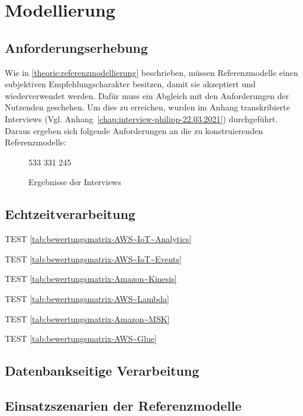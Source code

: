 \chapter{Modellierung}
\section{Anforderungserhebung}
Wie in \autoref{theorie:referenzmodellierung} beschrieben, müssen Referenzmodelle einen subjektiven Empfehlungscharakter besitzen, damit sie akzeptiert und wiederverwendet werden. Dafür muss ein Abgleich mit den Anforderungen der Nutzenden geschehen. Um dies zu erreichen, wurden im Anhang transkribierte Interviews (Vgl. Anhang~\ref{chap:interview-philipp-22.03.2021})  durchgeführt. Daraus ergeben sich folgende Anforderungen an die zu konstruierenden Referenzmodelle:



\begin{figure}[H]
\centering
\spideroverview
{5}{3}{3}
{3}{3}{1}
{2}{4}{5}
\caption{Ergebnisse der Interviews}
\label{abb:DimensionenUebersicht}
\end{figure}
\section{Echtzeitverarbeitung}

TEST \autoref{tab:bewertungsmatrix-AWS~IoT~Analytics}

TEST \autoref{tab:bewertungsmatrix-AWS~IoT~Events}

TEST \autoref{tab:bewertungsmatrix-Amazon~Kinesis}

TEST \autoref{tab:bewertungsmatrix-AWS~Lambda}

TEST \autoref{tab:bewertungsmatrix-Amazon~MSK}

TEST \autoref{tab:bewertungsmatrix-AWS~Glue}

\section{Datenbankseitige Verarbeitung}

\section{Einsatzszenarien der Referenzmodelle}